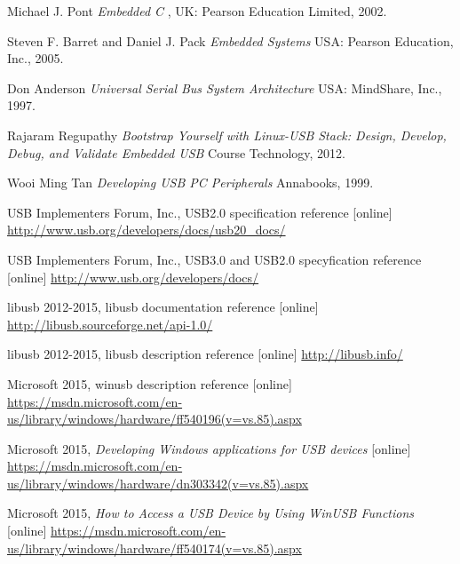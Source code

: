 \documentclass{BscUS}
\newcommand\blankpage{%
    \null
    \thispagestyle{empty}%
    \newpage}
\begin{document}
\newpage
\afterpage{\blankpage}
\begin{thebibliography}{1}

 Michael J. Pont {\em Embedded C       },  UK: Pearson Education Limited, 2002.

 Steven F. Barret and Daniel J. Pack {\em Embedded Systems} USA: Pearson Education, Inc., 2005.

 Don Anderson {\em Universal Serial Bus System Architecture } USA: MindShare, Inc., 1997.

 Rajaram Regupathy {\em Bootstrap Yourself with Linux-USB Stack: Design, Develop, Debug, and Validate Embedded USB } Course Technology, 2012.

 Wooi Ming Tan {\em Developing USB PC Peripherals } Annabooks, 1999.

 USB Implementers Forum, Inc., USB2.0 specification reference [online] 
\newline 
\url{http://www.usb.org/developers/docs/usb20_docs/}

 USB Implementers Forum, Inc., USB3.0 and USB2.0 specyfication reference [online] 
\newline 
\url{http://www.usb.org/developers/docs/}

 libusb 2012-2015, libusb documentation reference [online]
\newline 
\url{http://libusb.sourceforge.net/api-1.0/}

 libusb 2012-2015, libusb description reference [online]
\newline 
\url{http://libusb.info/}


 Microsoft 2015, winusb description reference [online]
\newline 
\url{https://msdn.microsoft.com/en-us/library/windows/hardware/ff540196(v=vs.85).aspx}

 Microsoft 2015, {\em Developing Windows applications for USB devices} [online]
\newline 
\url{https://msdn.microsoft.com/en-us/library/windows/hardware/dn303342(v=vs.85).aspx}

 Microsoft 2015, {\em How to Access a USB Device by Using WinUSB Functions} [online]
\newline 
\url{https://msdn.microsoft.com/en-us/library/windows/hardware/ff540174(v=vs.85).aspx}


\end{thebibliography}
\end{document}

